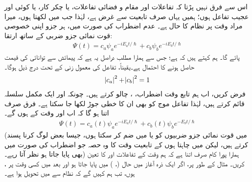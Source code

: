 اس سے فرق نہیں پڑتا کہ تفاعلات  اور  مقام و فضائی تفاعلات، یا چکر کار، یا کوئی اور عجیب تفاعل ہوں؛ ہمیں یہاں صرف تابعیت  سے غرض ہے، لہٰذا جب میں  لکھتا ہوں، میرا مراد وقت  پر نظام کا حال ہے۔ عدم اضطراب کی صورت میں، ہر جزو اپنی خصوصی قوت نمائی جزو ضربی کے ساتھ ارتقا:
\begin{align}
	\Psi(t)=c_a\psi_ae^{-iE_at/\hslash}+c_b\psi_be^{-iE_bt/\hslash}
\end{align}
پائے گا۔ ہم کہتے ہیں کہ   ہے؛ جس سے ہمارا مطلب دراصل یہ ہے کہ پیمائش سے توانائی کی قیمت  حاصل ہونے کا احتمال  ہے۔یقیناً، تفاعل  کی معمول زنی کے تحت درج ذیل ہوگا۔
\begin{align}\label{مساوات_تابع_مضطرب_معمول_زنی}
	\abs{c_a}^2+\abs{c_b}^2=1
\end{align}
 فرض کریں، اب ہم تابع وقت اضطراب، ، چالو کرتے ہیں۔ چونکہ  اور  ایک مکمل سلسلہ قائم کرتے ہیں، لہٰذا تفاعل موج  کو بھی ان کا خطی جوڑ لکھا جا سکتا ہے۔ فرق صرف اتنا ہو گا کہ اب  اور  وقت  کے  ہوں گے۔
\begin{align}\label{مساوات_تابع_مضطرب_وقت}
	\Psi(t)=c_a(t)\psi_ae^{-iE_at/\hslash}+c_b(t)\psi_be^{-E_bt/\hslash}
\end{align}
(میں قوت نمائی جزو ضربیوں کو  یا  میں ضم کر سکتا ہوں، جیسا بعض لوگ کرنا پسند کرتے ہیں، لیکن میں چاہتا ہوں کے تابعیت وقت کا وہ حصہ جو  اضطراب کی صورت میں بھی پایا جاتا ہو نظر آتا رہے۔) ہمارا پورا کام صرف اتنا ہے کہ ہم وقت کے تفاعلات  اور  کا تعین کریں۔ مثال کے طور پر، اگر ایک ذرہ آغاز میں حال  
(، ) میں پایا جاتا ہو اور بعد میں کسی وقت  پر ،  ہوں، تب ہم کہیں گے کہ نظام  سے  میں تحویل ہوا ہے۔

